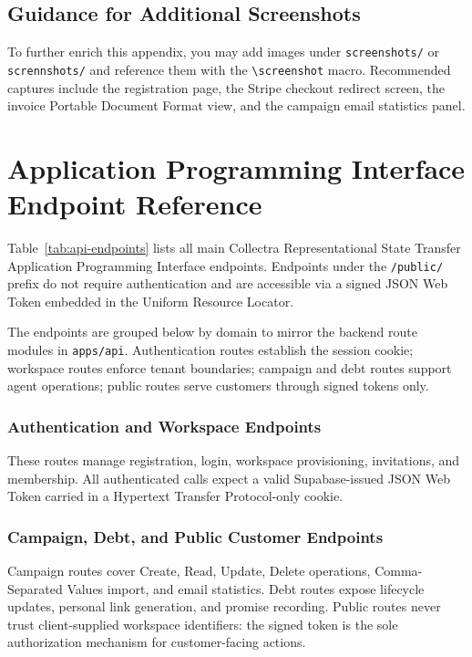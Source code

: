 \documentclass[12pt,a4paper]{report}
\begin{document}
\section{Guidance for Additional Screenshots}

To further enrich this appendix, you may add images under \texttt{screenshots/} or
\texttt{scrennshots/} and reference them with the \texttt{\textbackslash screenshot} macro.
Recommended captures include the registration page, the Stripe checkout redirect screen,
the invoice Portable Document Format view, and the campaign email statistics panel.

\chapter{Application Programming Interface Endpoint Reference}
\label{app:api}

Table~\ref{tab:api-endpoints} lists all main Collectra Representational State Transfer Application Programming Interface endpoints.
Endpoints under the \texttt{/public/} prefix do not require authentication and are
accessible via a signed JSON Web Token embedded in the Uniform Resource Locator.

The endpoints are grouped below by domain to mirror the backend route modules in
\texttt{apps/api}.
Authentication routes establish the session cookie; workspace routes enforce tenant
boundaries; campaign and debt routes support agent operations; public routes serve
customers through signed tokens only.

\subsection{Authentication and Workspace Endpoints}

These routes manage registration, login, workspace provisioning, invitations, and membership.
All authenticated calls expect a valid Supabase-issued JSON Web Token carried in a
Hypertext Transfer Protocol-only cookie.

\subsection{Campaign, Debt, and Public Customer Endpoints}

Campaign routes cover Create, Read, Update, Delete operations, Comma-Separated Values import, and email statistics.
Debt routes expose lifecycle updates, personal link generation, and promise recording.
Public routes never trust client-supplied workspace identifiers: the signed token is the sole
authorization mechanism for customer-facing actions.
\end{document}
